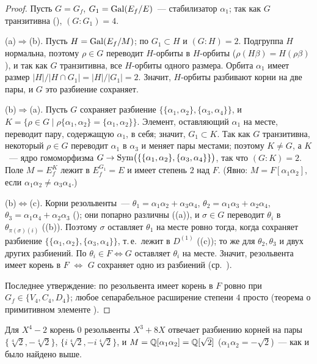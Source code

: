 \begin{proof}
Пусть $G=G_f$, $G_1=\operatorname{Gal}(E_f/E)$~--- стабилизатор $\alpha_1$; так как $G$ транзитивна (), $(G:G_1)=4$.

(a)$\Rightarrow$(b). Пусть $H=\operatorname{Gal}(E_f/M)$; по  $G_1\subset H$ и $(G:H)=2$. Подгруппа $H$ нормальна, поэтому $\rho\in G$
переводит $H$-орбиты в $H$-орбиты ($\rho(H\beta)=H(\rho\beta)$), и так как $G$ транзитивна, все $H$-орбиты одного размера.
Орбита $\alpha_1$ имеет размер $|H|/|H\cap G_1|=|H|/|G_1|=2$. Значит, $H$-орбиты разбивают корни на две пары, и $G$ это
разбиение сохраняет.

(b)$\Rightarrow$(a). Пусть $G$ сохраняет разбиение $\{\{\alpha_1,\alpha_2\},\{\alpha_3,\alpha_4\}\}$, и
$K=\{\rho\in G\mid \rho\{\alpha_1,\alpha_2\}=\{\alpha_1,\alpha_2\}\}$. Элемент, оставляющий $\alpha_1$ на месте, переводит пару,
содержащую $\alpha_1$, в себя; значит, $G_1\subset K$. Так как $G$ транзитивна, некоторый $\rho\in G$ переводит $\alpha_1$ в
$\alpha_3$ и меняет пары местами; поэтому $K\ne G$, а $K$~--- ядро гомоморфизма $G\to\operatorname{Sym}\bigl(\{\{\alpha_1,\alpha_2\},\{\alpha_3,\alpha_4\}\}\bigr)$, так что $(G:K)=2$. Поле $M=E_f^K$ лежит в $E_f^{G_1}=E$ и имеет степень $2$ над $F$.
(Явно: $M=F[\alpha_1\alpha_2]$, если $\alpha_1\alpha_2\ne\alpha_3\alpha_4$.)

(b)$\Leftrightarrow$(c). Корни резольвенты~--- $\theta_1=\alpha_1\alpha_2+\alpha_3\alpha_4$, $\theta_2=\alpha_1\alpha_3+\alpha_2\alpha_4$,
$\theta_3=\alpha_1\alpha_4+\alpha_2\alpha_3$ (); они попарно различны ((a)), и $\sigma\in G$ переводит $\theta_i$ в
$\theta_{\pi(\sigma)(i)}$ ((b)). Поэтому $\sigma$ оставляет $\theta_1$ на месте ровно тогда, когда сохраняет разбиение
$\{\{\alpha_1,\alpha_2\},\{\alpha_3,\alpha_4\}\}$, т.\,е.\ лежит в $D^{(1)}$ ((c)); то же для $\theta_2,\theta_3$ и двух других
разбиений. По  $\theta_i\in F\iff G$ оставляет $\theta_i$ на месте. Значит, резольвента имеет корень в $F$ $\iff$ $G$
сохраняет одно из разбиений (ср.\ ).

Последнее утверждение: по  резольвента имеет корень в $F$ ровно при $G_f\in\{V_4,C_4,D_4\}$; любое сепарабельное
расширение степени $4$ просто (теорема о примитивном элементе ).
\end{proof}

Для $X^4-2$ корень $0$ резольвенты $X^3+8X$ отвечает разбиению корней на пары $\{\sqrt[4]2,-\sqrt[4]2\}$,
$\{i\sqrt[4]2,-i\sqrt[4]2\}$, и $M=\mathbb Q[\alpha_1\alpha_2]=\mathbb Q[\sqrt2]$ ($\alpha_1\alpha_2=-\sqrt2$)~--- как и было найдено выше.

